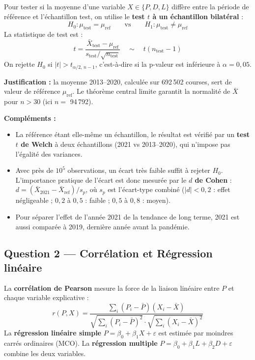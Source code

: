 \documentclass[11pt,a4paper]{article}
\begin{document}
Pour tester si la moyenne d'une variable $X \in \{P, D, L\}$ diffère entre la période de référence et
l'échantillon test, on utilise le \textbf{test $t$ à un échantillon bilatéral} :
\[
H_0 : \mu_{\text{test}} = \mu_{\text{ref}} \qquad \text{vs} \qquad H_1 : \mu_{\text{test}} \neq \mu_{\text{ref}}
\]
La statistique de test est :
\[
t = \frac{\bar X_{\text{test}} - \mu_{\text{ref}}}{s_{\text{test}} / \sqrt{n_{\text{test}}}} \quad\sim\quad t(n_{\text{test}} - 1)
\]
On rejette $H_0$ si $|t| > t_{\alpha/2,\,n-1}$, c'est-à-dire si la p-valeur est inférieure à $\alpha = 0{,}05$.

\textbf{Justification :} la moyenne 2013--2020, calculée sur 692\,502 courses, sert de valeur de référence
$\mu_{\text{ref}}$. Le théorème central limite garantit la normalité de $\bar X$ pour $n > 30$ (ici
$n = $ 94\,792).

\textbf{Compléments :}
\begin{itemize}
  \item La référence étant elle-même un échantillon, le résultat est vérifié par un \textbf{test $t$ de Welch}
        à deux échantillons (2021 vs 2013--2020), qui n'impose pas l'égalité des variances.
  \item Avec près de $10^5$ observations, un écart très faible suffit à rejeter $H_0$. L'importance pratique de
        l'écart est donc mesurée par le \textbf{$d$ de Cohen} :
        $d = (\bar X_{2021} - \bar X_{\text{ref}}) / s_p$, où $s_p$ est l'écart-type combiné
        ($|d| < 0{,}2$ : effet négligeable ; $0{,}2$ à $0{,}5$ : faible ; $0{,}5$ à $0{,}8$ : moyen).
  \item Pour séparer l'effet de l'année 2021 de la tendance de long terme, 2021 est aussi comparée à 2019,
        dernière année avant la pandémie.
\end{itemize}

\subsection{Question 2 --- Corrélation et Régression linéaire}

La \textbf{corrélation de Pearson} mesure la force de la liaison linéaire entre $P$ et chaque variable
explicative :
\[
r(P, X) = \frac{\sum_i (P_i - \bar P)(X_i - \bar X)}{\sqrt{\sum_i (P_i - \bar P)^2} \cdot \sqrt{\sum_i (X_i - \bar X)^2}}
\]
La \textbf{régression linéaire simple} $P = \beta_0 + \beta_1 X + \varepsilon$ est estimée par moindres carrés
ordinaires (MCO). La \textbf{régression multiple} $P = \beta_0 + \beta_1 L + \beta_2 D + \varepsilon$ combine les
deux variables.
\end{document}
